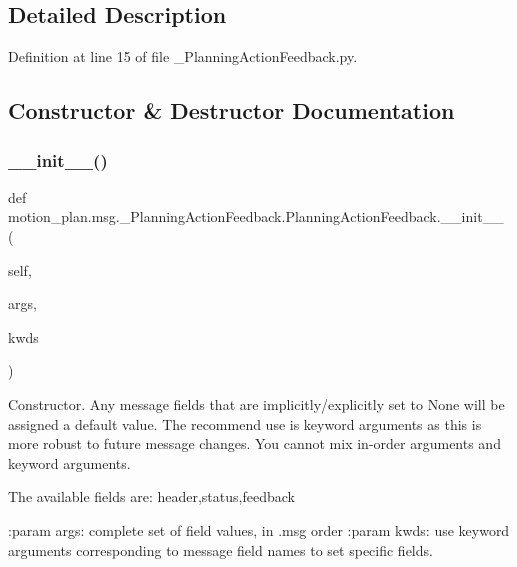 \subsection{Detailed Description}


Definition at line 15 of file \+\_\+\+Planning\+Action\+Feedback.\+py.



\subsection{Constructor \& Destructor Documentation}
\mbox{\label{classmotion__plan_1_1msg_1_1__PlanningActionFeedback_1_1PlanningActionFeedback_a5b856bb7904748076a31ed6d5a81b3c2}} 
\subsubsection{\texorpdfstring{\+\_\+\+\_\+init\+\_\+\+\_\+()}{\_\_init\_\_()}}
{\footnotesize\ttfamily def motion\+\_\+plan.\+msg.\+\_\+\+Planning\+Action\+Feedback.\+Planning\+Action\+Feedback.\+\_\+\+\_\+init\+\_\+\+\_\+ (\begin{DoxyParamCaption}\item[{}]{self,  }\item[{}]{args,  }\item[{}]{kwds }\end{DoxyParamCaption})}

\begin{DoxyVerb}Constructor. Any message fields that are implicitly/explicitly
set to None will be assigned a default value. The recommend
use is keyword arguments as this is more robust to future message
changes.  You cannot mix in-order arguments and keyword arguments.

The available fields are:
   header,status,feedback

:param args: complete set of field values, in .msg order
:param kwds: use keyword arguments corresponding to message field names
to set specific fields.
\end{DoxyVerb}
 

